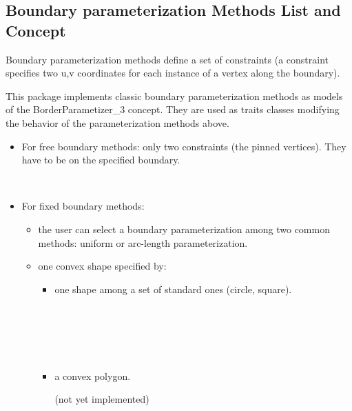 \subsection{Boundary parameterization Methods List and Concept}

Boundary parameterization methods define a
set of constraints (a constraint specifies two u,v coordinates for
each instance of a vertex along the boundary).

This package implements classic boundary parameterization methods
as models of the BorderParametizer\_3 concept. They are used as traits classes
modifying the behavior of the parameterization methods above.

\begin{itemize}

\item For free boundary methods: only two constraints (the pinned
vertices). They have to be on the specified boundary.

  \\

\item For fixed boundary methods:

    \begin{itemize}

    \item the user can select a boundary
        parameterization among two common methods: uniform or
        arc-length parameterization.

    \item one convex shape specified by:

        \begin{itemize}

        \item one shape among a set of standard ones (circle, square).

          \\
          \\
          \\
          \\

        \item a convex polygon.

        (not yet implemented)

        \end{itemize}

    \end{itemize}

\end{itemize}


